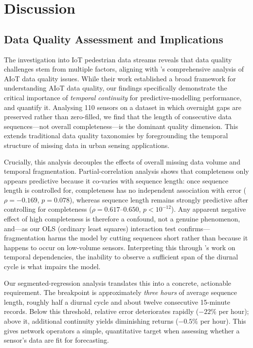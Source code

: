 \documentclass[journal,sensors,submit,pdftex,moreauthors]{Definitions/mdpi}
\begin{document}
\section{Discussion}

\subsection{Data Quality Assessment and Implications}

The investigation into IoT pedestrian data streams reveals that data quality challenges stem from multiple factors, aligning with \cite{karkouchDataQualityInternet2016}'s comprehensive analysis of AIoT data quality issues. While their work established a broad framework for understanding AIoT data quality, our findings specifically demonstrate the critical importance of \emph{temporal continuity} for predictive-modelling performance, and quantify it. Analysing 110 sensors on a dataset in which overnight gaps are preserved rather than zero-filled, we find that the length of consecutive data sequences---not overall completeness---is the dominant quality dimension. This extends traditional data quality taxonomies by foregrounding the temporal structure of missing data in urban sensing applications.

Crucially, this analysis decouples the effects of overall missing data volume and temporal fragmentation. Partial-correlation analysis shows that completeness only appears predictive because it co-varies with sequence length: once sequence length is controlled for, completeness has no independent association with error ($\rho = -0.169$, $p = 0.078$), whereas sequence length remains strongly predictive after controlling for completeness ($\rho = 0.617$--$0.650$, $p < 10^{-12}$). Any apparent negative effect of high completeness is therefore a confound, not a genuine phenomenon, and---as our OLS (ordinary least squares) interaction test confirms---fragmentation harms the model by cutting sequences short rather than because it happens to occur on low-volume sensors. Interpreting this through \cite{tehSensorDataQuality2020}'s work on temporal dependencies, the inability to observe a sufficient span of the diurnal cycle is what impairs the model.

Our segmented-regression analysis translates this into a concrete, actionable requirement. The breakpoint is approximately \emph{three hours} of average sequence length, roughly half a diurnal cycle and about twelve consecutive 15-minute records. Below this threshold, relative error deteriorates rapidly ($-22\%$ per hour); above it, additional continuity yields diminishing returns ($-0.5\%$ per hour). This gives network operators a simple, quantitative target when assessing whether a sensor's data are fit for forecasting.
\end{document}
